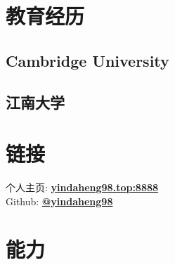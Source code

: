 \documentclass[]{deedy-resume-openfont}
\begin{document}
%
%

%
%

%
%

\begin{minipage}[t]{0.25\textwidth}


	\section{教育经历}
    \subsection{Cambridge University}
    \sectionsep
	\subsection{江南大学}
    \sectionsep
    

	\section{链接}
	个人主页: \newline\href{http://yindaheng98.top:8888}{\bf yindaheng98.top:8888} \\
	Github: \href{https://github.com/yindaheng98}{\bf @yindaheng98} \\
	\sectionsep




	\section{能力}

\end{minipage}
\end{document}
